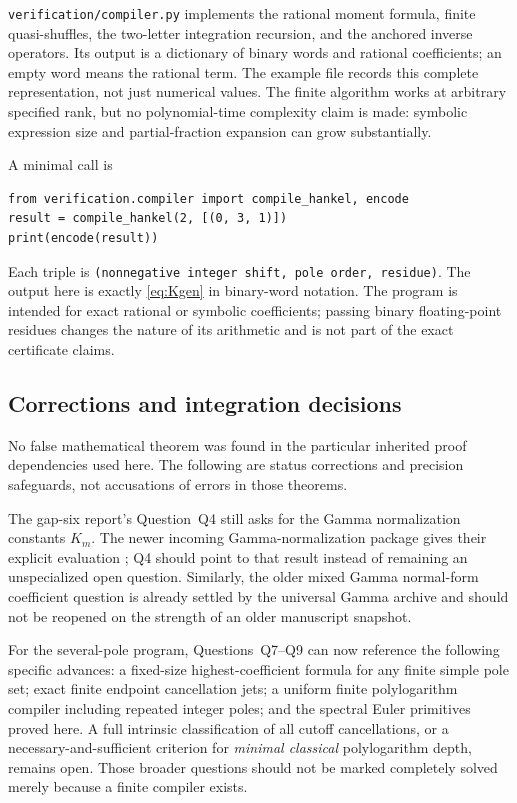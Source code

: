 \documentclass[11pt,letterpaper]{article}
\numberwithin{equation}{section}
\theoremstyle{definition}\newtheorem{definition}[theorem]{Definition}
\theoremstyle{remark}\newtheorem{remark}[theorem]{Remark}
\newcommand{\src}[1]{\nolinkurl{#1}}
\begin{document}
\src{verification/compiler.py} implements the rational moment formula,
finite quasi-shuffles, the two-letter integration recursion, and the
anchored inverse operators. Its output is a dictionary of binary
words and rational coefficients; an empty word means the rational
term. The example file records this complete representation, not just
numerical values. The finite algorithm works at arbitrary specified
rank, but no polynomial-time complexity claim is made: symbolic
expression size and partial-fraction expansion can grow substantially.

A minimal call is
\begin{verbatim}
from verification.compiler import compile_hankel, encode
result = compile_hankel(2, [(0, 3, 1)])
print(encode(result))
\end{verbatim}
Each triple is \texttt{(nonnegative integer shift, pole order, residue)}.
The output here is exactly \eqref{eq:Kgen} in binary-word notation.
The program is intended for exact rational or symbolic coefficients;
passing binary floating-point residues changes the nature of its
arithmetic and is not part of the exact certificate claims.

\subsection{Corrections and integration decisions}

No false mathematical theorem was found in the particular inherited
proof dependencies used here. The following are status corrections
and precision safeguards, not accusations of errors in those theorems.

The gap-six report's Question~Q4 still asks for the Gamma normalization
constants $K_m$. The newer incoming Gamma-normalization package gives
their explicit evaluation \cite{normalizations}; Q4 should point to
that result instead of remaining an unspecialized open question.
Similarly, the older mixed Gamma normal-form coefficient question is
already settled by the universal Gamma archive \cite{universal} and
should not be reopened on the strength of an older manuscript snapshot.

For the several-pole program, Questions~Q7--Q9 can now reference the
following specific advances: a fixed-size highest-coefficient formula
for any finite simple pole set; exact finite endpoint cancellation
jets; a uniform finite polylogarithm compiler including repeated
integer poles; and the spectral Euler primitives proved here.
A full intrinsic classification of all cutoff cancellations, or a
necessary-and-sufficient criterion for \emph{minimal classical}
polylogarithm depth, remains open. Those broader questions should not
be marked completely solved merely because a finite compiler exists.
\end{document}
